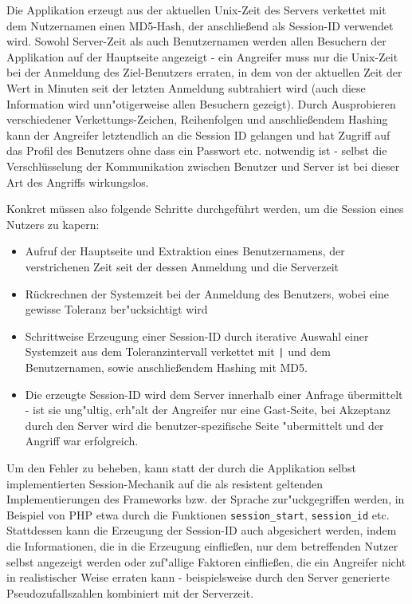 \documentclass[12pt,a4paper,titlepage,oneside]{scrartcl}
\begin{document}
Die Applikation erzeugt aus der aktuellen Unix-Zeit des Servers verkettet mit dem Nutzernamen einen MD5-Hash, der anschließend als Session-ID verwendet wird. Sowohl Server-Zeit als auch Benutzernamen werden allen Besuchern der Applikation auf der Hauptseite angezeigt - ein Angreifer muss nur die Unix-Zeit bei der Anmeldung des Ziel-Benutzers erraten, in dem von der aktuellen Zeit der Wert in Minuten seit der letzten Anmeldung subtrahiert wird (auch diese Information wird unn"otigerweise allen Besuchern gezeigt). Durch Ausprobieren verschiedener Verkettungs-Zeichen, Reihenfolgen und anschließendem Hashing kann der Angreifer letztendlich an die Session ID gelangen und hat Zugriff auf das Profil des Benutzers ohne dass ein Passwort etc. notwendig ist - selbst die Verschlüsselung der Kommunikation zwischen Benutzer und Server ist bei dieser Art des Angriffs wirkungslos.

Konkret müssen also folgende Schritte durchgeführt werden, um die Session eines Nutzers zu kapern:

\begin{itemize}
\item Aufruf der Hauptseite und Extraktion eines Benutzernamens, der verstrichenen Zeit seit der dessen Anmeldung und die Serverzeit
\item Rückrechnen der Systemzeit bei der Anmeldung des Benutzers, wobei eine gewisse Toleranz ber"ucksichtigt wird
\item Schrittweise Erzeugung einer Session-ID durch iterative Auswahl einer Systemzeit aus dem Toleranzintervall verkettet mit \texttt{|} und dem Benutzernamen, sowie anschließendem Hashing mit MD5.
\item Die erzeugte Session-ID wird dem Server innerhalb einer Anfrage übermittelt - ist sie ung"ultig, erh"alt der Angreifer nur eine Gast-Seite, bei Akzeptanz durch den Server wird die benutzer-spezifische Seite "ubermittelt und der Angriff war erfolgreich.
\end{itemize}

Um den Fehler zu beheben, kann statt der durch die Applikation selbst implementierten Session-Mechanik auf die als resistent geltenden Implementierungen des Frameworks bzw. der Sprache zur"uckgegriffen werden, in Beispiel von PHP etwa durch die Funktionen \texttt{session\_start}, \texttt{session\_id} etc. Stattdessen kann die Erzeugung der Session-ID auch abgesichert werden, indem die Informationen, die in die Erzeugung einfließen, nur dem betreffenden Nutzer selbst angezeigt werden oder zuf"allige Faktoren einfließen, die ein Angreifer nicht in realistischer Weise erraten kann - beispielsweise durch den Server generierte Pseudozufallszahlen kombiniert mit der Serverzeit. 
\end{document}
